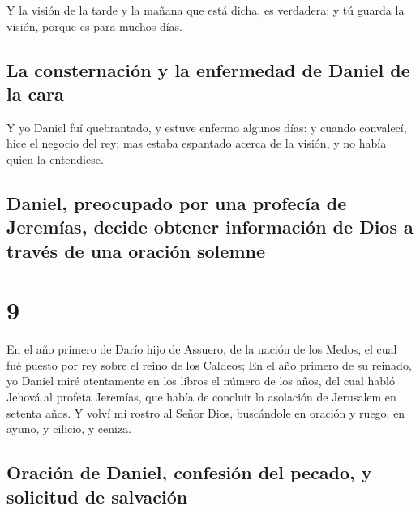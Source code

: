  Y la visión de la tarde y la mañana que está dicha, es
verdadera: y tú guarda la visión, porque es para muchos días.

\hypertarget{la-consternaciuxf3n-y-la-enfermedad-de-daniel-de-la-cara}{%
\subsection{La consternación y la enfermedad de Daniel de la
cara}\label{la-consternaciuxf3n-y-la-enfermedad-de-daniel-de-la-cara}}

 Y yo Daniel fuí quebrantado, y estuve enfermo algunos
días: y cuando convalecí, hice el negocio del rey; mas estaba espantado
acerca de la visión, y no había quien la entendiese.

\hypertarget{daniel-preocupado-por-una-profecuxeda-de-jeremuxedas-decide-obtener-informaciuxf3n-de-dios-a-travuxe9s-de-una-oraciuxf3n-solemne}{%
\subsection{Daniel, preocupado por una profecía de Jeremías, decide
obtener información de Dios a través de una oración
solemne}\label{daniel-preocupado-por-una-profecuxeda-de-jeremuxedas-decide-obtener-informaciuxf3n-de-dios-a-travuxe9s-de-una-oraciuxf3n-solemne}}

\hypertarget{section-27-9}{%
\section{9}\label{section-27-9}}

 En el año primero de Darío hijo de Assuero, de la nación
de los Medos, el cual fué puesto por rey sobre el reino de los Caldeos;
 En el año primero de su reinado, yo Daniel miré
atentamente en los libros el número de los años, del cual habló Jehová
al profeta Jeremías, que había de concluir la asolación de Jerusalem en
setenta años.  Y volví mi rostro al Señor Dios, buscándole
en oración y ruego, en ayuno, y cilicio, y ceniza.

\hypertarget{oraciuxf3n-de-daniel-confesiuxf3n-del-pecado-y-solicitud-de-salvaciuxf3n}{%
\subsection{Oración de Daniel, confesión del pecado, y solicitud de
salvación}\label{oraciuxf3n-de-daniel-confesiuxf3n-del-pecado-y-solicitud-de-salvaciuxf3n}}

